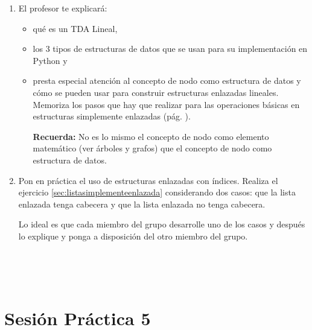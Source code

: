 \begin{enumerate}%

\item El profesor te explicará:
	\begin{itemize}
	\item qué es un TDA Lineal,
	\item los 3 tipos de estructuras de datos que se usan para su implementación en Python y
	\item presta especial atención al concepto de nodo como estructura de datos y  cómo se pueden usar para construir estructuras enlazadas lineales. Memoriza los pasos que hay que realizar para las operaciones básicas en estructuras simplemente enlazadas (pág. \pageref{subsec:operacionesBasicasSimplemente}).
	
	\textbf{Recuerda:} No es lo mismo el concepto de nodo como elemento matemático (ver árboles y grafos) que el concepto de nodo como estructura de datos.
	\end{itemize}

\item Pon en práctica el uso de estructuras enlazadas con índices. Realiza el ejercicio \ref{sec:listasimplementeenlazada} considerando dos casos: que la lista enlazada tenga cabecera y que la lista enlazada no tenga cabecera.

Lo ideal es que cada miembro del grupo desarrolle uno de los casos y después lo explique y  ponga a disposición del otro miembro del grupo.

\end{enumerate}




\


\


\section*{Sesión Práctica 5}


